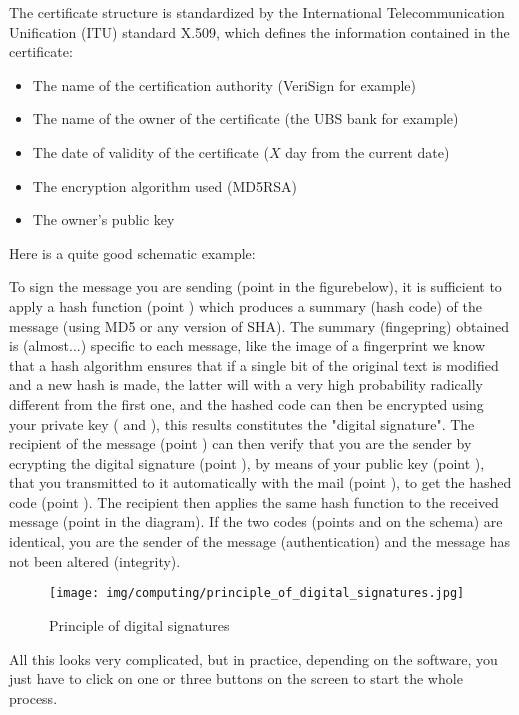 	The certificate structure is standardized by the International Telecommunication Unification (ITU) standard X.509, which defines the information contained in the certificate:
	\begin{itemize}
		\item The name of the certification authority (VeriSign for example)

		\item The name of the owner of the certificate (the UBS bank for example)

		\item The date of validity of the certificate ($X$ day from the current date)

		\item The encryption algorithm used (MD5RSA)

		\item The owner's public key
	\end{itemize}
	Here is a quite good schematic example:
	
	To sign the message you are sending (point  in the figurebelow), it is sufficient to apply a hash function (point ) which produces a summary (hash code) of the message (using MD5 or any version of SHA). The summary (fingepring) obtained is (almost...) specific to each message, like the image of a fingerprint we know that a hash algorithm ensures that if a single bit of the original text is modified and a new hash is made, the latter will with a very high probability radically different from the first one, and the hashed code can then be encrypted using your private key ( and ), this results constitutes the "digital signature". The recipient of the message (point ) can then verify that you are the sender by ecrypting the digital signature (point ), by means of your public key (point ), that you transmitted to it automatically with the mail (point ), to get the hashed code (point ). The recipient then applies the same hash function to the received message (point  in the diagram). If the two codes (points  and  on the schema) are identical, you are the sender of the message (authentication) and the message has not been altered (integrity).
	\begin{figure}[H]
		\centering
		\texttt{[image: img/computing/principle\_of\_digital\_signatures.jpg]}
		\caption{Principle of digital signatures}
	\end{figure}
	All this looks very complicated, but in practice, depending on the software, you just have to click on one or three buttons on the screen to start the whole process.

